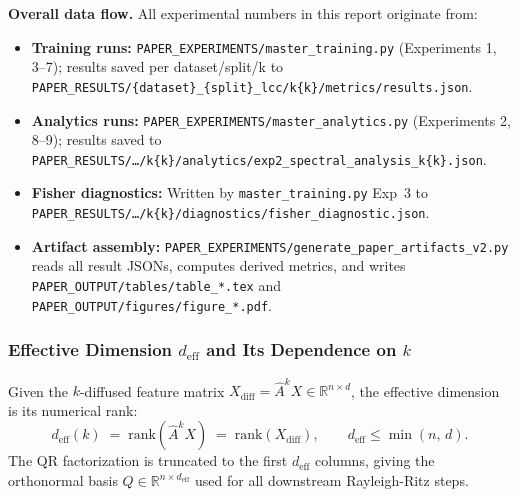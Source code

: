 \documentclass[11pt]{article}
\begin{document}
\noindent\textbf{Overall data flow.}
All experimental numbers in this report originate from:
\begin{itemize}
  \item \textbf{Training runs:} \texttt{PAPER\_EXPERIMENTS/master\_training.py}
    (Experiments 1, 3--7); results saved per dataset/split/k to
    \texttt{PAPER\_RESULTS/\{dataset\}\_\{split\}\_lcc/k\{k\}/metrics/results.json}.
  \item \textbf{Analytics runs:} \texttt{PAPER\_EXPERIMENTS/master\_analytics.py}
    (Experiments 2, 8--9); results saved to
    \texttt{PAPER\_RESULTS/\ldots/k\{k\}/analytics/exp2\_spectral\_analysis\_k\{k\}.json}.
  \item \textbf{Fisher diagnostics:} Written by \texttt{master\_training.py} Exp~3 to
    \texttt{PAPER\_RESULTS/\ldots/k\{k\}/diagnostics/fisher\_diagnostic.json}.
  \item \textbf{Artifact assembly:} \texttt{PAPER\_EXPERIMENTS/generate\_paper\_artifacts\_v2.py}
    reads all result JSONs, computes derived metrics, and writes
    \texttt{PAPER\_OUTPUT/tables/table\_*.tex} and
    \texttt{PAPER\_OUTPUT/figures/figure\_*.pdf}.
\end{itemize}

\subsubsection*{Effective Dimension $d_{\mathrm{eff}}$ and Its Dependence on $k$}

Given the $k$-diffused feature matrix $X_{\mathrm{diff}} = \hat{A}^k X \in \mathbb{R}^{n \times d}$,
the effective dimension is its numerical rank:
\[
  d_{\mathrm{eff}}(k) \;=\; \mathrm{rank}\!\left(\hat{A}^k X\right)
  \;=\; \mathrm{rank}(X_{\mathrm{diff}}),
  \qquad d_{\mathrm{eff}} \leq \min(n,\,d).
\]
The QR factorization is truncated to the first $d_{\mathrm{eff}}$ columns, giving the
orthonormal basis $Q \in \mathbb{R}^{n \times d_{\mathrm{eff}}}$ used for all downstream
Rayleigh-Ritz steps.
\end{document}
